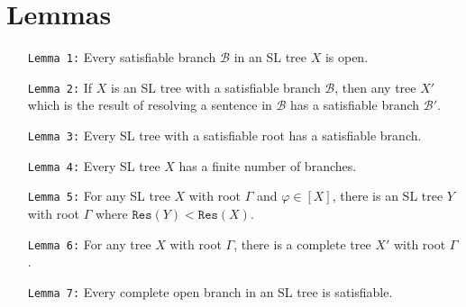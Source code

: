 \documentclass[a4paper, 11pt]{article} %
\newcommand{\B}{\mathcal{B}}
\newcommand{\res}{\texttt{Res}}
\begin{document}
\noindent


%

\section*{Lemmas}

\begin{enumerate}
  \item[\tt Lemma 1:] Every satisfiable branch $\B$ in an SL tree $X$ is open. 
  \item[\tt Lemma 2:] If $X$ is an SL tree with a satisfiable branch $\B$, then any tree $X'$ which is the result of resolving a sentence in $\B$ has a satisfiable branch $\B'$.  
  \item[\tt Lemma 3:] Every SL tree with a satisfiable root has a satisfiable branch.
  \item[\tt Lemma 4:] Every SL tree $X$ has a finite number of branches.  
  \item[\tt Lemma 5:] For any SL tree $X$ with root $\Gamma$ and $\varphi\in[X]$, there is an SL tree $Y$ with root $\Gamma$ where $\res(Y)<\res(X)$. 
  \item[\tt Lemma 6:] For any tree $X$ with root $\Gamma$, there is a complete tree $X'$ with root $\Gamma$. 
  \item[\tt Lemma 7:] Every complete open branch in an SL tree is satisfiable.
\end{enumerate}
\end{document}

